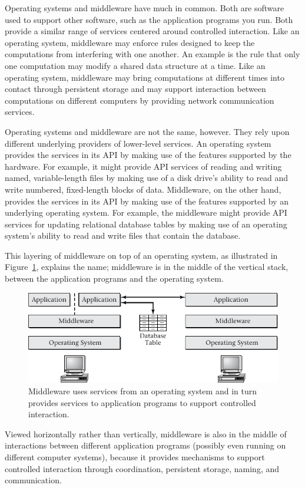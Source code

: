 Operating
systems and middleware have much in common.  Both are software used to
support other software, such as the application programs you run.
Both provide a similar range of services centered around controlled
interaction.  Like an operating system, middleware may enforce rules
designed to keep the computations from interfering with one another.
An example is the rule that only one computation may modify a shared data structure
at a time.  Like an operating system, middleware may bring
computations at different times into contact through persistent
storage and may support interaction between computations on different
computers by providing network communication services.

Operating systems and middleware are not the same, however.  They rely upon
different underlying providers of lower-level services.  An
operating system provides the services in its API by making use of the
features supported by the hardware.  For example, it might provide API
services of reading and writing named, variable-length files by making
use of a disk drive's ability to read and write numbered, fixed-length
blocks of data.  Middleware, on the other hand, provides the services
in its API by making use of the features supported by an underlying
operating system.  For example, the middleware might provide API
services for updating relational database tables by making use of an
operating system's ability to read and write files that contain the database.

This layering of middleware on top of an operating system, as illustrated
in Figure~\ref{scan-1-2}, explains the
name; middleware is in the middle of the vertical stack, between the
application programs and the operating system.
\begin{figure}
\centerline{\includegraphics{hail_f0102}}
\caption{Middleware uses services from an operating system and in turn
provides services to application programs to support controlled interaction.}
\label{scan-1-2}
\end{figure}
Viewed horizontally rather than vertically, middleware is also in the
middle of interactions between different application programs
(possibly even running on different computer systems), because it
provides mechanisms to support controlled interaction through
coordination, persistent storage, naming, and communication.


